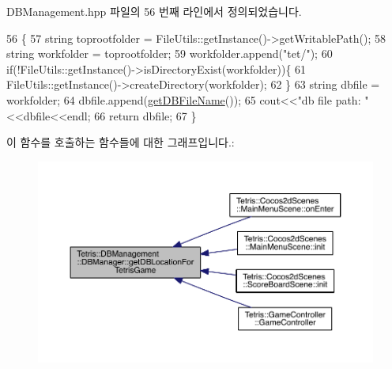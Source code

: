 D\+B\+Management.\+hpp 파일의 56 번째 라인에서 정의되었습니다.


\begin{DoxyCode}
56                                                       \{
57                 \textcolor{keywordtype}{string} toprootfolder = FileUtils::getInstance()->getWritablePath();
58                 \textcolor{keywordtype}{string} workfolder = toprootfolder;
59                 workfolder.append(\textcolor{stringliteral}{"tet/"});
60                 \textcolor{keywordflow}{if}(!FileUtils::getInstance()->isDirectoryExist(workfolder))\{
61                     FileUtils::getInstance()->createDirectory(workfolder);
62                 \}
63                 \textcolor{keywordtype}{string} dbfile = workfolder;
64                 dbfile.append(\hyperlink{class_tetris_1_1_d_b_management_1_1_d_b_manager_a5d49e7fac7d2a65973151a7fb81ea560}{getDBFileName}());
65                 cout<<\textcolor{stringliteral}{"db file path: "}<<dbfile<<endl;
66                 \textcolor{keywordflow}{return} dbfile;
67             \}
\end{DoxyCode}
이 함수를 호출하는 함수들에 대한 그래프입니다.\+:
\nopagebreak
\begin{figure}[H]
\begin{center}
\leavevmode
\includegraphics[width=350pt]{da/d79/class_tetris_1_1_d_b_management_1_1_d_b_manager_ae50cfd222e276a5ca27e17c886aa5dd5_icgraph}
\end{center}
\end{figure}
\mbox{\label{class_tetris_1_1_d_b_management_1_1_d_b_manager_a9cb81505055490211a9b5c79c3c22c18}} 
